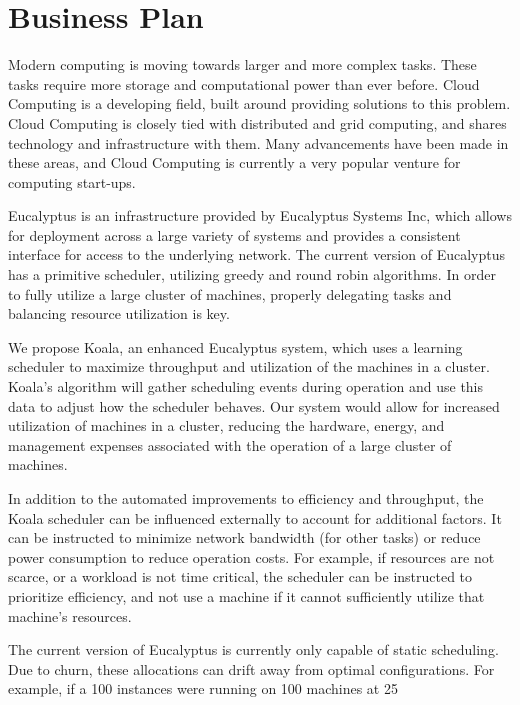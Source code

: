\section{Business Plan}
  Modern computing is moving towards larger and more complex tasks.  These tasks require more storage and computational power than ever before.  Cloud Computing is a developing field, built around providing solutions to this problem.  Cloud Computing is closely tied with distributed and grid computing, and shares technology and infrastructure with them.  Many advancements have been made in these areas, and Cloud Computing is currently a very popular venture for computing start-ups.

  Eucalyptus is an infrastructure provided by Eucalyptus Systems Inc, which allows for deployment across a large variety of systems and provides a consistent interface for access to the underlying network.  The current version of Eucalyptus has a primitive scheduler, utilizing greedy and round robin algorithms.  In order to fully utilize a large cluster of machines, properly delegating tasks and balancing resource utilization is key.

  We propose Koala, an enhanced Eucalyptus system, which uses a learning scheduler to maximize throughput and utilization of the machines in a cluster.  Koala's algorithm will gather scheduling events during operation and use this data to adjust how the scheduler behaves.  Our system would allow for increased utilization of machines in a cluster, reducing the hardware, energy, and management expenses associated with the operation of a large cluster of machines.

  In addition to the automated improvements to efficiency and throughput, the Koala scheduler can be influenced externally to account for additional factors.  It can be instructed to minimize network bandwidth (for other tasks) or reduce power consumption to reduce operation costs.  For example, if resources are not scarce, or a workload is not time critical, the scheduler can be instructed to prioritize efficiency, and not use a machine if it cannot sufficiently utilize that machine's resources.
 
  The current version of Eucalyptus is currently only capable of static scheduling.  Due to churn, these allocations can drift away from optimal configurations.  For example, if a 100 instances were running on 100 machines at 25%


